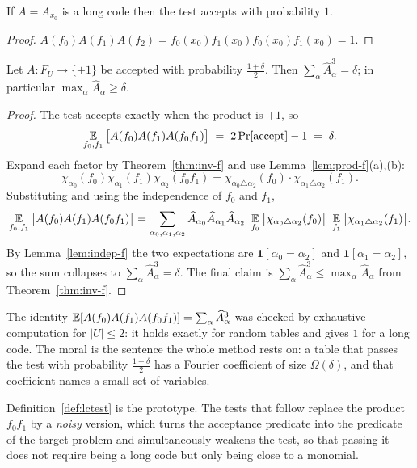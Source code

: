 \begin{lemma}[Completeness]\label{lem:lctest-complete}
If $A=A_{x_0}$ is a long code then the test accepts with probability $1$.
\end{lemma}
\begin{proof}
$A(f_0)A(f_1)A(f_2)=f_0(x_0)f_1(x_0)f_0(x_0)f_1(x_0)=1$.
\end{proof}

\begin{theorem}\label{thm:lctest}
Let $A\colon F_U\to\{\pm1\}$ be accepted with probability $\tfrac{1+\delta}{2}$.  Then $\sum_\alpha\widehat A_\alpha^3=\delta$; in particular $\max_\alpha\widehat A_\alpha\ge\delta$.
\end{theorem}
\begin{proof}
The test accepts exactly when the product is $+1$, so
\[
  \operatorname*{\mathbb{E}}_{f_0,f_1}\big[A(f_0)A(f_1)A(f_0f_1)\big]\;=\;2\Pr[\text{accept}]-1\;=\;\delta .
\]
Expand each factor by Theorem~\ref{thm:inv-f} and use Lemma~\ref{lem:prod-f}(a),(b):
\[
  \chi_{\alpha_0}(f_0)\chi_{\alpha_1}(f_1)\chi_{\alpha_2}(f_0f_1)=\chi_{\alpha_0\triangle\alpha_2}(f_0)\cdot\chi_{\alpha_1\triangle\alpha_2}(f_1).
\]
Substituting and using the independence of $f_0$ and $f_1$,
\[
  \E_{f_0,f_1}\big[A(f_0)A(f_1)A(f_0f_1)\big]
  =\sum_{\alpha_0,\alpha_1,\alpha_2}\widehat A_{\alpha_0}\widehat A_{\alpha_1}\widehat A_{\alpha_2}\ \E_{f_0}\big[\chi_{\alpha_0\triangle\alpha_2}(f_0)\big]\ \E_{f_1}\big[\chi_{\alpha_1\triangle\alpha_2}(f_1)\big].
\]
By Lemma~\ref{lem:indep-f} the two expectations are $\mathbf 1[\alpha_0=\alpha_2]$ and $\mathbf 1[\alpha_1=\alpha_2]$, so the sum collapses to $\sum_\alpha\widehat A_\alpha^3=\delta$.
The final claim is $\sum_\alpha\widehat A_\alpha^3\le\max_\alpha\widehat A_\alpha$ from Theorem~\ref{thm:inv-f}.
\end{proof}

\noindent
The identity $\operatorname*{\mathbb{E}}[A(f_0)A(f_1)A(f_0f_1)]=\sum_\alpha\widehat A_\alpha^3$ was checked by exhaustive computation for $|U|\le2$: it holds exactly for random tables and gives $1$ for a long code.
The moral is the sentence the whole method rests on: a table that passes the test with probability $\tfrac{1+\delta}{2}$ has a Fourier coefficient of size $\Omega(\delta)$, and that coefficient names a small set of variables.

Definition~\ref{def:lctest} is the prototype.  The tests that follow replace the product $f_0f_1$ by a \emph{noisy} version, which turns the acceptance predicate into the predicate of the target problem and simultaneously weakens the test, so that passing it does not require being a long code but only being close to a monomial.


